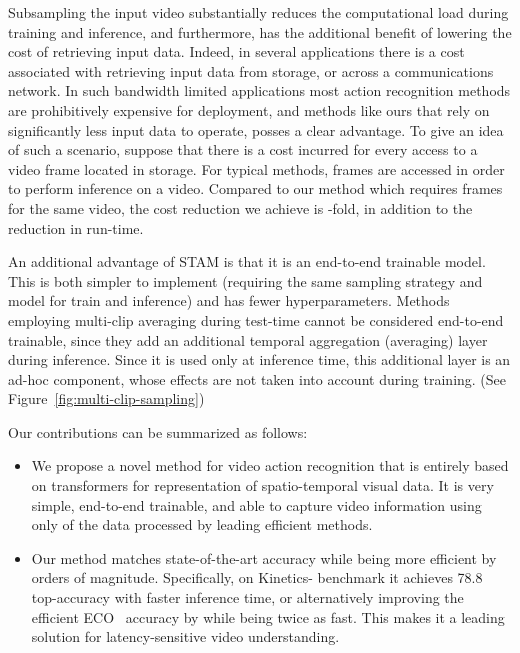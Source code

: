 \documentclass[10pt,twocolumn,letterpaper]{article}
\begin{document}
Subsampling the input video substantially reduces the computational load during training and inference, and furthermore, has the additional benefit of lowering the cost of retrieving input data. Indeed, in several applications there is a cost associated with retrieving input data from storage, or across a communications network. In such bandwidth limited applications most action recognition methods are prohibitively expensive for deployment, and methods like ours that rely on significantly less input data to operate, posses a clear advantage. To give an idea of such a scenario, suppose that there is a cost incurred for every access to a video frame located in storage. For typical methods,  frames are accessed in order to perform inference on a video. Compared to our method which requires  frames for the same video, the cost reduction we achieve is -fold, in addition to the reduction in run-time. 

An additional advantage of STAM is that it is an end-to-end trainable model.  This is both simpler to implement (requiring the same sampling strategy and model for train and inference) and has fewer hyperparameters.  Methods employing multi-clip averaging during test-time cannot be considered end-to-end trainable, since they add an additional temporal aggregation (averaging) layer during inference. Since it is used only at inference time, this additional layer is an ad-hoc component, whose effects are not taken into account during training. (See Figure~\ref{fig:multi-clip-sampling})

Our contributions can be summarized as follows:
\begin{itemize}
    \item We propose a novel method for video action recognition that is entirely based on transformers for representation of spatio-temporal visual data.
It is very simple, end-to-end trainable, and able to capture video information using only  of the data processed by leading efficient methods.
\item Our method matches state-of-the-art accuracy while being more efficient by orders of magnitude. Specifically, on Kinetics- benchmark it achieves 78.8 top-accuracy with  faster inference time, or alternatively improving the efficient ECO~\cite{zolfaghari2018eco} accuracy by  while being twice as fast. This makes it a leading solution for latency-sensitive video understanding. \end{itemize}
\end{document}
